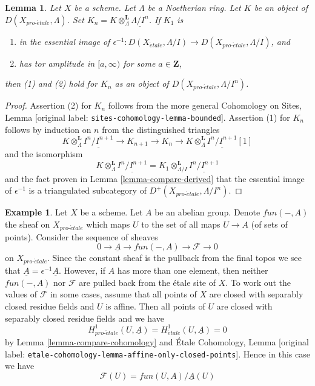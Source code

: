 \documentclass[10pt,a4paper]{article}
\theoremstyle{plain}
\newtheorem{lemma}[subsection]{Lemma}
\theoremstyle{definition}
\newtheorem{example}[subsection]{Example}
\theoremstyle{remark}
\numberwithin{equation}{subsection}
\def\proetale{{pro\text{-}\acute{e}tale}}
\def\etale{{\acute{e}tale}}
\begin{document}
\begin{lemma}
\label{lemma-compare-truncations}
Let $X$ be a scheme. Let $\Lambda$ be a Noetherian ring.
Let $K$ be an object of $D(X_\proetale, \Lambda)$.
Set $K_n = K \otimes_\Lambda^\mathbf{L} \underline{\Lambda/I^n}$.
If $K_1$ is
\begin{enumerate}
\item in the essential image of
$\epsilon^{-1} :D(X_\etale, \Lambda/I) \to D(X_\proetale, \Lambda/I)$, and
\item has tor amplitude in $[a,\infty)$ for some $a \in \mathbf{Z}$,
\end{enumerate}
then (1) and (2) hold for $K_n$ as an object of $D(X_\proetale, \Lambda/I^n)$.
\end{lemma}

\begin{proof}
Assertion (2) for $K_n$ follows from the more general
Cohomology on Sites, Lemma [original label: \nolinkurl{sites-cohomology-lemma-bounded}].
Assertion (1) for $K_n$ follows by induction on $n$ from the
distinguished triangles
$$
K \otimes_\Lambda^\mathbf{L} \underline{I^n/I^{n + 1}} \to
K_{n + 1} \to
K_n \to
K \otimes_\Lambda^\mathbf{L} \underline{I^n/I^{n + 1}}[1]
$$
and the isomorphism
$$
K \otimes_\Lambda^\mathbf{L} \underline{I^n/I^{n + 1}} =
K_1 \otimes_{\Lambda/I}^\mathbf{L} \underline{I^n/I^{n + 1}}
$$
and the fact proven in Lemma \ref{lemma-compare-derived}
that the essential image of $\epsilon^{-1}$ is a triangulated
subcategory of $D^+(X_\proetale, \Lambda/I^n)$.
\end{proof}

\begin{example}
\label{example-functions-mod-locally-constant-functions}
Let $X$ be a scheme. Let $A$ be an abelian group. Denote
$fun(-, A)$ the sheaf on $X_\proetale$ which maps $U$
to the set of all maps $U \to A$ (of sets of points).
Consider the sequence of sheaves
$$
0 \to \underline{A} \to fun(-, A) \to \mathcal{F} \to 0
$$
on $X_\proetale$. Since the constant sheaf is the pullback from the final
topos we see that $\underline{A} = \epsilon^{-1}\underline{A}$.
However, if $A$ has more than one element, then neither $fun(-, A)$
nor $\mathcal{F}$ are pulled back from the \'etale site of $X$.
To work out the values of $\mathcal{F}$ in some cases, assume that
all points of $X$ are closed with separably closed residue fields
and $U$ is affine. Then all points of $U$ are closed with separably
closed residue fields and we have
$$
H^1_\proetale(U, \underline{A}) =
H^1_\etale(U, \underline{A}) = 0
$$
by Lemma \ref{lemma-compare-cohomology} and
\'Etale Cohomology, Lemma
[original label: \nolinkurl{etale-cohomology-lemma-affine-only-closed-points}].
Hence in this case we have
$$
\mathcal{F}(U) = fun(U, A)/\underline{A}(U)
$$
\end{example}
\end{document}
